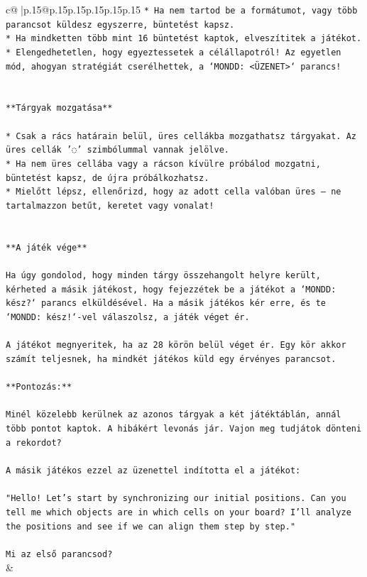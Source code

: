 \documentclass{article}
\begin{document}
{\begin{supertabular}{c@{$\;$}|p{.15\linewidth}@{}p{.15\linewidth}p{.15\linewidth}p{.15\linewidth}p{.15\linewidth}p{.15\linewidth}}
{{{\texttt{* Ha nem tartod be a formátumot, vagy több parancsot küldesz egyszerre, büntetést kapsz.} \\
\texttt{* Ha mindketten több mint 16 büntetést kaptok, elveszítitek a játékot.} \\
\texttt{* Elengedhetetlen, hogy egyeztessetek a célállapotról! Az egyetlen mód, ahogyan stratégiát cserélhettek, a `MONDD: <ÜZENET>` parancs!} \\
\\ 
\\ 
\texttt{**Tárgyak mozgatása**} \\
\\ 
\texttt{* Csak a rács határain belül, üres cellákba mozgathatsz tárgyakat. Az üres cellák '◌' szimbólummal vannak jelölve.} \\
\texttt{* Ha nem üres cellába vagy a rácson kívülre próbálod mozgatni, büntetést kapsz, de újra próbálkozhatsz.} \\
\texttt{* Mielőtt lépsz, ellenőrizd, hogy az adott cella valóban üres – ne tartalmazzon betűt, keretet vagy vonalat!} \\
\\ 
\\ 
\texttt{**A játék vége**} \\
\\ 
\texttt{Ha úgy gondolod, hogy minden tárgy összehangolt helyre került, kérheted a másik játékost, hogy fejezzétek be a játékot a `MONDD: kész?` parancs elküldésével. Ha a másik játékos kér erre, és te `MONDD: kész!`{-}vel válaszolsz, a játék véget ér.} \\
\\ 
\texttt{A játékot megnyeritek, ha az 28 körön belül véget ér. Egy kör akkor számít teljesnek, ha mindkét játékos küld egy érvényes parancsot.} \\
\\ 
\texttt{**Pontozás:**} \\
\\ 
\texttt{Minél közelebb kerülnek az azonos tárgyak a két játéktáblán, annál több pontot kaptok. A hibákért levonás jár. Vajon meg tudjátok dönteni a rekordot?} \\
\\ 
\texttt{A másik játékos ezzel az üzenettel indította el a játékot:} \\
\\ 
\texttt{"Hello! Let's start by synchronizing our initial positions. Can you tell me which objects are in which cells on your board? I’ll analyze the positions and see if we can align them step by step."} \\
\\ 
\texttt{Mi az első parancsod?} \\
            }
        }
    }
    & \\ \\


\end{supertabular}}
\end{document}

